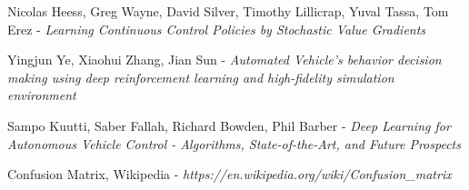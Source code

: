 \begin{thebibliography}{9}
Nicolas Heess, Greg Wayne, David Silver, Timothy Lillicrap, Yuval Tassa, Tom Erez - \textsl{Learning Continuous Control Policies by Stochastic Value Gradients}

Yingjun Ye, Xiaohui Zhang, Jian Sun - \textsl{Automated Vehicle's behavior decision making using deep reinforcement learning and high-fidelity simulation environment}

Sampo Kuutti, Saber Fallah, Richard Bowden, Phil Barber - \textsl{Deep Learning for Autonomous Vehicle Control - Algorithms, State-of-the-Art, and Future Prospects}

Confusion Matrix, Wikipedia - \textsl{https://en.wikipedia.org/wiki/Confusion\_matrix}

\end{thebibliography}